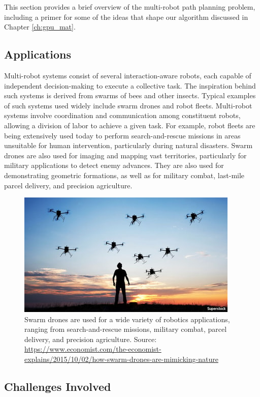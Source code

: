 This section provides a brief overview of the multi-robot path planning problem, including a primer for some of the ideas that shape our algorithm discussed in Chapter \ref{ch:gpu_mat}. 

\subsection{Applications}

Multi-robot systems consist of several interaction-aware robots, each capable of independent decision-making to execute a collective task. The inspiration behind such systems is derived from swarms of bees and other insects. Typical examples of such systems used widely include swarm drones and robot fleets. Multi-robot systems involve coordination and communication among constituent robots, allowing a division of labor to achieve a given task. For example, robot fleets are being extensively used today to perform search-and-rescue missions in areas unsuitable for human intervention, particularly during natural disasters. Swarm drones are also used for imaging and mapping vast territories, particularly for military applications to detect enemy advances. They are also used for demonstrating geometric formations, as well as for military combat, last-mile parcel delivery, and precision agriculture. 

\begin{figure}[ht]
    \centering
    \includegraphics[scale=0.5]{figures/background/swarm_drones.jpg}
    \caption[Swarm Drones]{Swarm drones are used for a wide variety of robotics applications, ranging from search-and-rescue missions, military combat, parcel delivery, and precision agriculture. Source: \scriptsize{\url{https://www.economist.com/the-economist-explains/2015/10/02/how-swarm-drones-are-mimicking-nature}}}
    \label{fig:swarm-drones}
\end{figure}

\subsection{Challenges Involved}\label{sec: multiagent_challenges}

